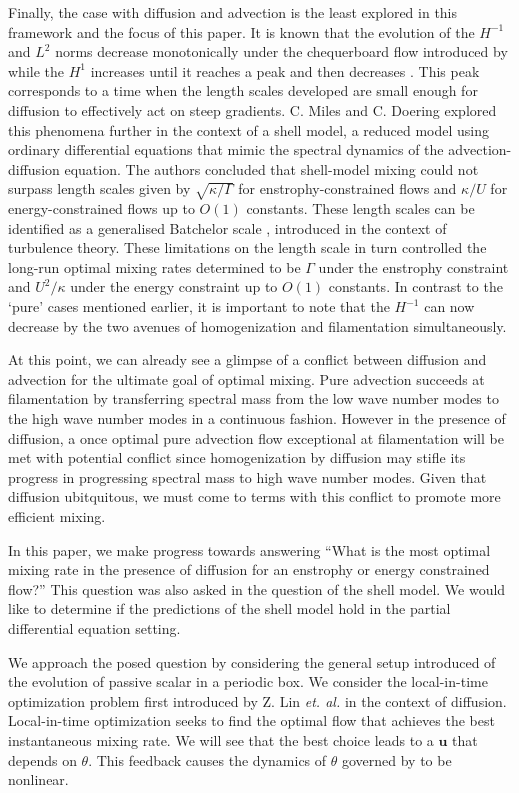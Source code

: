 \documentclass[12pt]{iopart}
\renewcommand{\vec}[1]{\mathbf{#1}}
\begin{document}
Finally, the case with diffusion and advection is the least explored in this framework and the focus of this paper. 
It is known that the evolution of the $H^{-1}$ and $L^2$ norms decrease monotonically under the chequerboard flow introduced by \cite{JMP2012}
 while the $H^{1}$ increases until it reaches a peak and then decreases \cite{DF2014}. This peak corresponds to a  time when the length scales developed are small enough for diffusion to effectively act on steep gradients. C. Miles and C. Doering \cite{Miles2017a} explored this phenomena further in the context of a shell model, a reduced model using ordinary differential equations that mimic the spectral dynamics of the advection-diffusion equation. The authors concluded that shell-model mixing could not surpass length scales given by $\sqrt{\kappa/ \Gamma}$ for enstrophy-constrained flows and $\kappa/U$ for energy-constrained flows up to $O(1)$ constants. These length scales can be identified as a generalised Batchelor scale \cite{Batchelor1959a}, introduced in the context of turbulence theory. These limitations on the length scale in turn controlled the long-run optimal mixing rates determined to be $\Gamma$ under the enstrophy constraint and $U^2/\kappa$ under the energy constraint up to $O(1)$ constants. In contrast to the `pure' cases mentioned earlier, it is important to note that the $H^{-1}$ can now decrease by the two avenues of homogenization and filamentation simultaneously. 

At this point, we can already see a glimpse of a conflict between diffusion and advection for the ultimate goal of optimal mixing. Pure advection succeeds at filamentation by transferring spectral mass from the low wave number modes to the high wave number modes in a continuous fashion. However in the presence of diffusion, a once optimal pure advection flow exceptional at filamentation will be met with potential conflict since homogenization by diffusion may stifle its progress in progressing spectral mass to high wave number modes. Given that diffusion ubitquitous, we must come to terms with this conflict to promote more efficient mixing.

In this paper, we make progress towards answering ``What is the most optimal mixing rate in the presence of diffusion for an enstrophy or energy constrained flow?'' This question was also asked in the question of the shell model. We would like to determine if the predictions of the shell model hold in the partial differential equation setting. 

We approach the posed question by considering the general setup introduced of the evolution of passive scalar in a periodic box. We consider the local-in-time optimization problem first introduced by Z. Lin {\it et. al.} \cite{JFM2011} in the context of diffusion. Local-in-time optimization seeks to find the optimal flow that achieves the best instantaneous mixing rate. We will see that the best choice leads to a $\vec{u}$ that depends on $\theta$. This feedback causes the dynamics of $\theta$ governed by  to be nonlinear.
\end{document}

